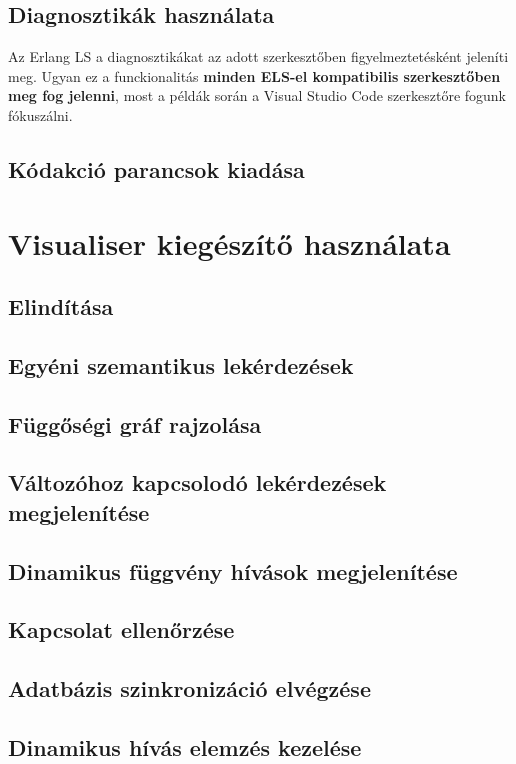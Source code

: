 

















\subsection{Diagnosztikák használata}
Az Erlang LS a diagnosztikákat az adott szerkesztőben figyelmeztetésként jeleníti meg. Ugyan ez a funckionalitás \textbf{minden ELS-el kompatibilis szerkesztőben meg fog jelenni}, most a példák során a Visual Studio Code szerkesztőre fogunk fókuszálni.



\subsection{Kódakció parancsok kiadása}
\section{Visualiser kiegészítő használata}
\subsection{Elindítása}
\subsection{Egyéni szemantikus lekérdezések}
\subsection{Függőségi gráf rajzolása}
\subsection{Változóhoz kapcsolodó lekérdezések megjelenítése}
\subsection{Dinamikus függvény hívások megjelenítése}
\subsection{Kapcsolat ellenőrzése}
\subsection{Adatbázis szinkronizáció elvégzése}
\subsection{Dinamikus hívás elemzés kezelése}
